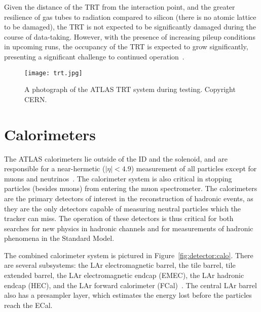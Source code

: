 Given the distance of the TRT from the interaction point, and the greater resilience of gas tubes to radiation compared to silicon (there is no atomic lattice to be damaged), the TRT is not expected to be significantly damaged during the course of data-taking. However, with the presence of increasing pileup conditions in upcoming runs, the occupancy of the TRT is expected to grow significantly, presenting a significant challenge to continued operation~\cite{TRTOccupancy}.


\begin{figure}
\centering
\texttt{[image: trt.jpg]}
\label{fig:detector:trt}
\caption{A photograph of the ATLAS TRT system during testing. Copyright CERN.}
\end{figure}


\section{Calorimeters}

The ATLAS calorimeters lie outside of the ID and the solenoid, and are responsible for a near-hermetic ($|\eta| < 4.9$) measurement of all particles except for muons and neutrinos~\cite{ATLASPaper}.  The calorimeter system is also critical in stopping particles (besides muons) from entering the muon spectrometer. The calorimeters are the primary detectors of interest in the reconstruction of hadronic events, as they are the only detectors capable of measuring neutral particles which the tracker can miss. The operation of these detectors is thus critical for both searches for new physics in hadronic channels and for measurements of hadronic phenomena in the Standard Model.

The combined calorimeter system is pictured in Figure~\ref{fig:detector:calo}. There are several subsystems: the LAr electromagnetic barrel, the tile barrel, tile extended barrel, the LAr electromagnetic endcap (EMEC), the LAr hadronic endcap (HEC), and the LAr forward calorimeter (FCal)~\cite{ATLASPaper}. The central LAr barrel also has a presampler layer, which estimates the energy lost before the particles reach the ECal.

